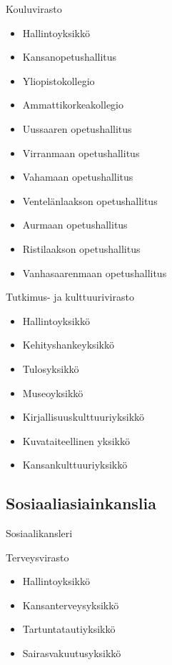 \documentclass{article}
\begin{document}
	Kouluvirasto
	\begin{itemize}
		\item Hallintoyksikkö
		\item Kansanopetushallitus
		\item Yliopistokollegio
		\item Ammattikorkeakollegio
		\item Uussaaren opetushallitus
		\item Virranmaan opetushallitus
		\item Vahamaan opetushallitus
		\item Ventelänlaakson opetushallitus
		\item Aurmaan opetushallitus
		\item Ristilaakson opetushallitus
		\item Vanhasaarenmaan opetushallitus
	\end{itemize}

	\vspace{12pt}
	
	Tutkimus- ja kulttuurivirasto
	\begin{itemize}
		\item Hallintoyksikkö
		\item Kehityshankeyksikkö
		\item Tulosyksikkö
		\item Museoyksikkö
		\item Kirjallisuuskulttuuriyksikkö
		\item Kuvataiteellinen yksikkö
		\item Kansankulttuuriyksikkö
	\end{itemize}

	\subsection{Sosiaaliasiainkanslia}
	Sosiaalikansleri
	
	\vspace{12pt}
	
	Terveysvirasto
	\begin{itemize}
		\item Hallintoyksikkö
		\item Kansanterveysyksikkö
		\item Tartuntatautiyksikkö
		\item Sairasvakuutusyksikkö
	\end{itemize}

	\vspace{12pt}
	
\end{document}
